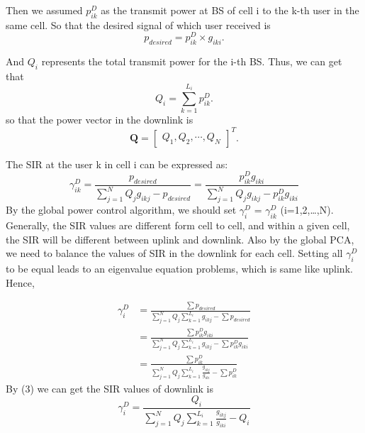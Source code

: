 \documentclass[12pt]{article}
\begin{document}
Then we assumed $p_{ik}^D$ as the transmit power at BS of cell i to the k-th user in the same cell. So that the desired signal of which user received is \begin{equation*}
p_{desired}= p_{ik}^D \times g_{iki}.
\end{equation*}

And $Q_i$ represents the total transmit power for the i-th BS. Thus, we can get that
\begin{equation}
Q_i= \sum_{k=1}^{L_i} p_{ik}^D.
\end{equation}
so that the power vector in the downlink is \begin{equation*}
\bm Q = \left[ \begin{matrix}
Q_1,Q_2,\cdots,Q_N
\end{matrix}\right]^T. 
\end{equation*}

The SIR at the user k in cell i can be expressed as:
\begin{equation}
\gamma_{ik}^D = \frac{p_{desired} }{\sum\limits_{j=1}^N Q_jg_{ikj}-p_{desired}} = \frac{p_{ik}^D g_{iki}}{\sum\limits_{j=1}^N Q_jg_{ikj}-p_{ik}^D g_{iki}}
\end{equation}
By the global power control algorithm, we should set  $\gamma_i^D$ = $\gamma_{ik}^D$ (i=1,2,\dots,N). Generally, the SIR values are different form cell to cell, and within a given cell, the SIR will be different between uplink and downlink. Also by the global PCA, we need to balance the values of SIR in the downlink for each cell. Setting all $\gamma_i^D$to be equal leads to an eigenvalue equation problems, which is same like uplink. Hence,



\begin{align*}
\gamma_i^D&=\frac{\sum p_{desired} }{\sum\limits_{j=1}^N Q_j \sum\limits_{k=1}^{L_i} g_{ikj}-\sum p_{desired}}\\   
&=\frac{\sum p_{ik}^D g_{iki} } {\sum\limits_{j=1}^N Q_j \sum\limits_{k=1}^{L_i} g_{ikj}-\sum p_{ik}^D g_{iki}}\\
&=\frac{\sum p_{ik}^D  } {\sum\limits_{j=1}^N Q_j \sum\limits_{k=1}^{L_i} \frac{g_{ikj}}{g_{iki}}-\sum p_{ik}^D}
\end{align*}
By (3) we can get the SIR values of downlink is \begin{equation}
\gamma_i^D=\frac{Q_i  } {\sum\limits_{j=1}^N Q_j \sum\limits_{k=1}^{L_i} \frac{g_{ikj}}{g_{iki}}-Q_i}
\end{equation}
\end{document}
